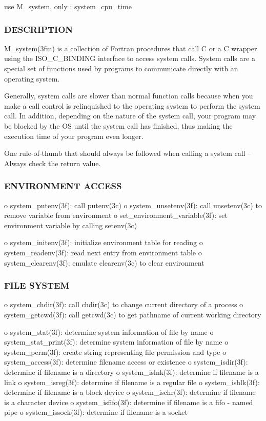 use M\+\_\+system, only \+: system\+\_\+cpu\+\_\+time

\subsubsection*{D\+E\+S\+C\+R\+I\+P\+T\+I\+ON}

M\+\_\+system(3fm) is a collection of Fortran procedures that call C or a C wrapper using the I\+S\+O\+\_\+\+C\+\_\+\+B\+I\+N\+D\+I\+NG interface to access system calls. System calls are a special set of functions used by programs to communicate directly with an operating system.

Generally, system calls are slower than normal function calls because when you make a call control is relinquished to the operating system to perform the system call. In addition, depending on the nature of the system call, your program may be blocked by the OS until the system call has finished, thus making the execution time of your program even longer.

One rule-\/of-\/thumb that should always be followed when calling a system call -- Always check the return value. \subsubsection*{E\+N\+V\+I\+R\+O\+N\+M\+E\+NT A\+C\+C\+E\+SS}

o system\+\_\+putenv(3f)\+: call putenv(3c) o system\+\_\+unsetenv(3f)\+: call unsetenv(3c) to remove variable from environment o set\+\_\+environment\+\_\+variable(3f)\+: set environment variable by calling setenv(3c)

o system\+\_\+initenv(3f)\+: initialize environment table for reading o system\+\_\+readenv(3f)\+: read next entry from environment table o system\+\_\+clearenv(3f)\+: emulate clearenv(3c) to clear environment \subsubsection*{F\+I\+LE S\+Y\+S\+T\+EM}

o system\+\_\+chdir(3f)\+: call chdir(3c) to change current directory of a process o system\+\_\+getcwd(3f)\+: call getcwd(3c) to get pathname of current working directory

o system\+\_\+stat(3f)\+: determine system information of file by name o system\+\_\+stat\+\_\+print(3f)\+: determine system information of file by name o system\+\_\+perm(3f)\+: create string representing file permission and type o system\+\_\+access(3f)\+: determine filename access or existence o system\+\_\+isdir(3f)\+: determine if filename is a directory o system\+\_\+islnk(3f)\+: determine if filename is a link o system\+\_\+isreg(3f)\+: determine if filename is a regular file o system\+\_\+isblk(3f)\+: determine if filename is a block device o system\+\_\+ischr(3f)\+: determine if filename is a character device o system\+\_\+isfifo(3f)\+: determine if filename is a fifo -\/ named pipe o system\+\_\+issock(3f)\+: determine if filename is a socket

